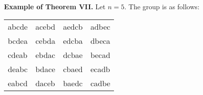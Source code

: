 \documentclass{article}
\begin{document}
\medskip
\noindent
\textbf{Example of Theorem VII.}
Let $n = 5$. The group is as follows:
\begin{center}
\begin{tabular}{l|l|l|l}
abcde & acebd & aedcb & adbec \\
bcdea & cebda & edcba & dbeca \\
cdeab & ebdac & dcbae & becad \\
deabc & bdace & cbaed & ecadb \\
eabcd & daceb & baedc & cadbe \\
\end{tabular}
\end{center}
\end{document}
